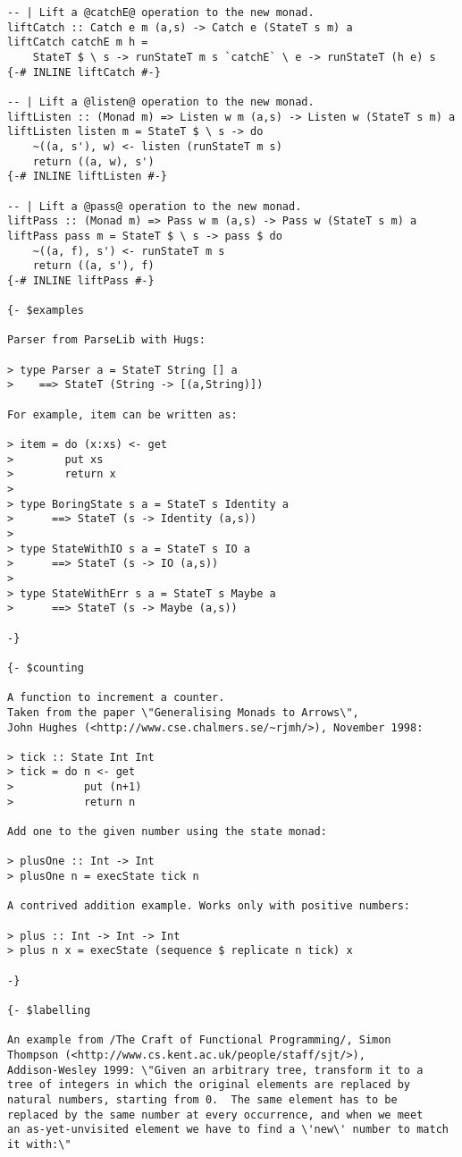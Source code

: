 \begin{lstlisting}
-- | Lift a @catchE@ operation to the new monad.
liftCatch :: Catch e m (a,s) -> Catch e (StateT s m) a
liftCatch catchE m h =
    StateT $ \ s -> runStateT m s `catchE` \ e -> runStateT (h e) s
{-# INLINE liftCatch #-}

-- | Lift a @listen@ operation to the new monad.
liftListen :: (Monad m) => Listen w m (a,s) -> Listen w (StateT s m) a
liftListen listen m = StateT $ \ s -> do
    ~((a, s'), w) <- listen (runStateT m s)
    return ((a, w), s')
{-# INLINE liftListen #-}

-- | Lift a @pass@ operation to the new monad.
liftPass :: (Monad m) => Pass w m (a,s) -> Pass w (StateT s m) a
liftPass pass m = StateT $ \ s -> pass $ do
    ~((a, f), s') <- runStateT m s
    return ((a, s'), f)
{-# INLINE liftPass #-}

{- $examples

Parser from ParseLib with Hugs:

> type Parser a = StateT String [] a
>    ==> StateT (String -> [(a,String)])

For example, item can be written as:

> item = do (x:xs) <- get
>        put xs
>        return x
>
> type BoringState s a = StateT s Identity a
>      ==> StateT (s -> Identity (a,s))
>
> type StateWithIO s a = StateT s IO a
>      ==> StateT (s -> IO (a,s))
>
> type StateWithErr s a = StateT s Maybe a
>      ==> StateT (s -> Maybe (a,s))

-}

{- $counting

A function to increment a counter.
Taken from the paper \"Generalising Monads to Arrows\",
John Hughes (<http://www.cse.chalmers.se/~rjmh/>), November 1998:

> tick :: State Int Int
> tick = do n <- get
>           put (n+1)
>           return n

Add one to the given number using the state monad:

> plusOne :: Int -> Int
> plusOne n = execState tick n

A contrived addition example. Works only with positive numbers:

> plus :: Int -> Int -> Int
> plus n x = execState (sequence $ replicate n tick) x

-}

{- $labelling

An example from /The Craft of Functional Programming/, Simon
Thompson (<http://www.cs.kent.ac.uk/people/staff/sjt/>),
Addison-Wesley 1999: \"Given an arbitrary tree, transform it to a
tree of integers in which the original elements are replaced by
natural numbers, starting from 0.  The same element has to be
replaced by the same number at every occurrence, and when we meet
an as-yet-unvisited element we have to find a \'new\' number to match
it with:\"


\end{lstlisting}
